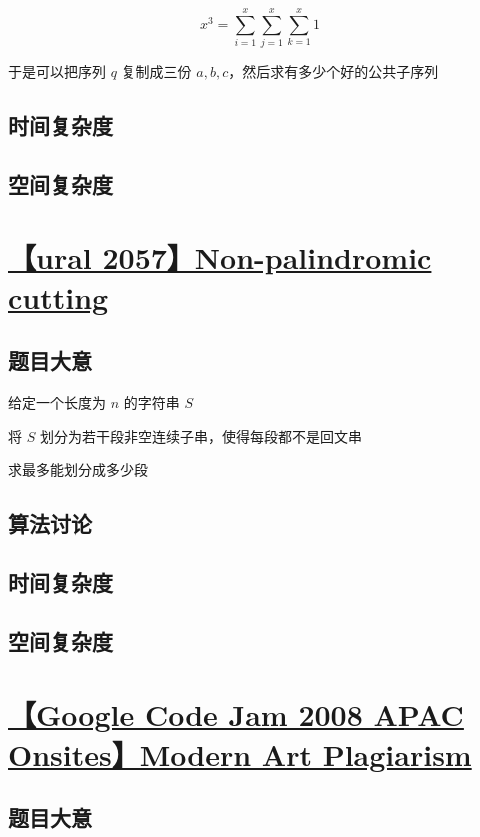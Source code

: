 \documentclass[UTF8]{article}
\begin{document}
$$
x^3=\sum_{i=1}^{x}\sum_{j=1}^{x}\sum_{k=1}^{x}1
$$

于是可以把序列 $q$ 复制成三份 $a,b,c$，然后求有多少个好的公共子序列

\subsection{时间复杂度}

\subsection{空间复杂度}

\section{\href{https://vjudge.net/problem/URAL-2057}{【ural 2057】Non-palindromic cutting}}

\subsection{题目大意}

给定一个长度为 $n$ 的字符串 $S$

将 $S$ 划分为若干段非空连续子串，使得每段都不是回文串

求最多能划分成多少段

\subsection{算法讨论}

\subsection{时间复杂度}

\subsection{空间复杂度}

\section{\href{https://www.lydsy.com/JudgeOnline/problem.php?id=2368}{【Google Code Jam 2008 APAC Onsites】Modern Art Plagiarism}}

\subsection{题目大意}
\end{document}
